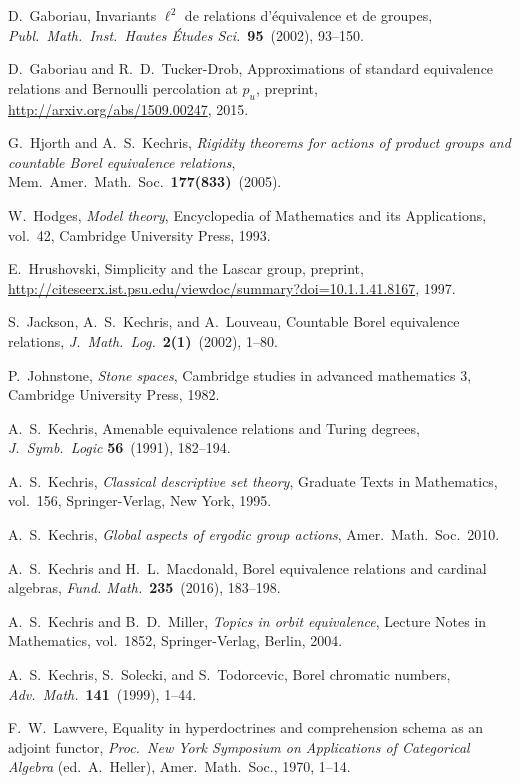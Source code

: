 \documentclass[11pt]{article}
\begin{document}
\begin{thebibliography}{00000}
  D.~Gaboriau, Invariants $\ell^2$ de relations d'équivalence et de groupes, \emph{Publ.\ Math.\ Inst.\ Hautes Études Sci.}\ \textbf{95}~(2002), 93--150.

  D.~Gaboriau and R.~D.~Tucker-Drob, Approximations of standard equivalence relations and Bernoulli percolation at $p_u$, preprint, \url{http://arxiv.org/abs/1509.00247}, 2015.

  G.~Hjorth and A.~S.~Kechris, \emph{Rigidity theorems for actions of product groups and countable Borel equivalence relations}, Mem.\ Amer.\ Math.\ Soc.\ \textbf{177(833)}~(2005).

  W.~Hodges, \emph{Model theory}, Encyclopedia of Mathematics and its Applications, vol.~42, Cambridge University Press, 1993.

  E.~Hrushovski, Simplicity and the Lascar group, preprint, \url{http://citeseerx.ist.psu.edu/viewdoc/summary?doi=10.1.1.41.8167}, 1997.

  S.~Jackson, A.~S.~Kechris, and A.~Louveau, Countable Borel equivalence relations, \emph{J.\ Math.\ Log.}\ \textbf{2(1)}~(2002), 1--80.

  P.~Johnstone, \emph{Stone spaces}, Cambridge studies in advanced mathematics 3, Cambridge University Press, 1982.

  A.~S.~Kechris, Amenable equivalence relations and Turing degrees, \emph{J.\ Symb.\ Logic} \textbf{56}~(1991), 182--194.

  A.~S.~Kechris, \emph{Classical descriptive set theory}, Graduate Texts in Mathematics, vol.~156, Springer-Verlag, New York, 1995.

  A.~S.~Kechris, \emph{Global aspects of ergodic group actions}, Amer.\ Math.\ Soc.\ 2010.

  A.~S.~Kechris and H.~L.~Macdonald, Borel equivalence relations and cardinal algebras, \emph{Fund. Math.}\ \textbf{235}~(2016), 183--198.


  A.~S.~Kechris and B.~D.~Miller, \emph{Topics in orbit equivalence}, Lecture Notes in Mathematics, vol.~1852, Springer-Verlag, Berlin, 2004.

  A.~S.~Kechris, S.~Solecki, and S.~Todorcevic, Borel chromatic numbers, \emph{Adv.\ Math.}\ \textbf{141}~(1999), 1--44.

  F.~W.~Lawvere, Equality in hyperdoctrines and comprehension schema as an adjoint functor, \emph{Proc.\ New York Symposium on Applications of Categorical Algebra} (ed.\ A.~Heller), Amer.\ Math.\ Soc., 1970, 1--14.


\end{thebibliography}
\end{document}
